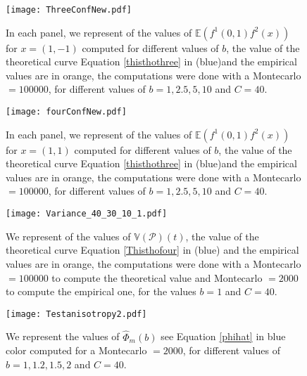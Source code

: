 \documentclass[12pt]{article}
\renewcommand{\hat}{\widehat}
\theoremstyle{Theorem}
\begin{document}
\begin{figure}[H]
  \centering
    {\texttt{[image: ThreeConfNew.pdf]}}
    \hspace{0.2cm}
 \caption{In each panel, we represent of the values of $\mathbb{E}\left(f^{1}(0,1)f^{2}(x)\right)$ for $x = (1,-1)$ computed for different values of $b$, the value of the theoretical curve Equation \eqref{thisthothree} in (blue)and the empirical values are in orange, the computations were done with a Montecarlo $= 100000$, for different values of $b = 1, 2.5, 5, 10$ and $C = 40$. }
\label{fig2}
\end{figure}

\begin{figure}[H]
  \centering
    {\texttt{[image: fourConfNew.pdf]}}
    \hspace{0.2cm}
 \caption{In each panel, we represent of the values of $\mathbb{E}\left(f^{1}(0,1)f^{2}(x)\right)$ for $x = (1, 1)$ computed for different values of $b$, the value of the theoretical curve Equation \eqref{thisthothree} in (blue)and the empirical values are in orange, the computations were done with a Montecarlo $= 100000$, for different values of $b = 1, 2.5, 5, 10$ and $C = 40$. }
\label{fig2}
\end{figure}

\begin{figure}[H]
  \centering
    {\texttt{[image: Variance\_40\_30\_10\_1.pdf]}}
    \hspace{0.2cm}
 \caption{We represent of the values of $\mathbb{V}\left(\mathcal{P}\right)(t)$, the value of the theoretical curve Equation \eqref{Thisthofour} in (blue) and the empirical values are in orange, the computations were done with a Montecarlo $= 100000$ to compute the theoretical value and Montecarlo $= 2000$ to compute the empirical one, for the values $b = 1$ and $C = 40$. }
\label{fig2}
\end{figure}

\begin{figure}[H]
  \centering
    {\texttt{[image: Testanisotropy2.pdf]}}
    \hspace{0.2cm} 
 \caption{We represent the values of $\hat{\Phi}_{m}(b)$ see Equation \eqref{phihat} in blue color computed for a Montecarlo $= 2000$, for different values of $b = 1, 1.2, 1.5, 2$ and $C = 40$.}
\label{fig2}
\end{figure}
\end{document}
